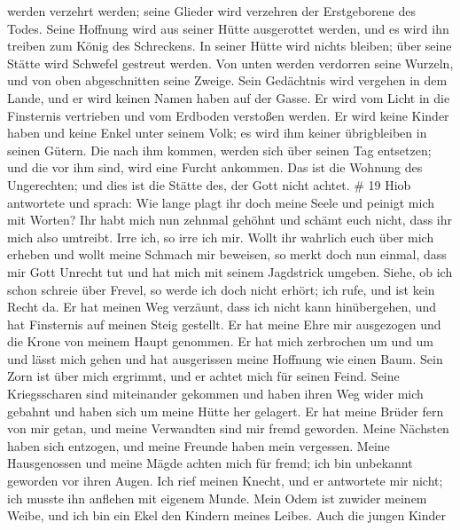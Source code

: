 werden verzehrt werden; seine Glieder wird verzehren der Erstgeborene
des Todes.  Seine Hoffnung wird aus seiner Hütte
ausgerottet werden, und es wird ihn treiben zum König des Schreckens.
 In seiner Hütte wird nichts bleiben; über seine Stätte
wird Schwefel gestreut werden.  Von unten werden verdorren
seine Wurzeln, und von oben abgeschnitten seine Zweige. 
Sein Gedächtnis wird vergehen in dem Lande, und er wird keinen Namen
haben auf der Gasse.  Er wird vom Licht in die Finsternis
vertrieben und vom Erdboden verstoßen werden.  Er wird
keine Kinder haben und keine Enkel unter seinem Volk; es wird ihm keiner
übrigbleiben in seinen Gütern.  Die nach ihm kommen, werden
sich über seinen Tag entsetzen; und die vor ihm sind, wird eine Furcht
ankommen.  Das ist die Wohnung des Ungerechten; und dies
ist die Stätte des, der Gott nicht achtet. \# 19  Hiob
antwortete und sprach:  Wie lange plagt ihr doch meine Seele
und peinigt mich mit Worten?  Ihr habt mich nun zehnmal
gehöhnt und schämt euch nicht, dass ihr mich also umtreibt. 
Irre ich, so irre ich mir.  Wollt ihr wahrlich euch über
mich erheben und wollt meine Schmach mir beweisen,  so merkt
doch nun einmal, dass mir Gott Unrecht tut und hat mich mit seinem
Jagdstrick umgeben.  Siehe, ob ich schon schreie über
Frevel, so werde ich doch nicht erhört; ich rufe, und ist kein Recht da.
 Er hat meinen Weg verzäunt, dass ich nicht kann
hinübergehen, und hat Finsternis auf meinen Steig gestellt. 
Er hat meine Ehre mir ausgezogen und die Krone von meinem Haupt
genommen.  Er hat mich zerbrochen um und um und lässt mich
gehen und hat ausgerissen meine Hoffnung wie einen Baum. 
Sein Zorn ist über mich ergrimmt, und er achtet mich für seinen Feind.
 Seine Kriegsscharen sind miteinander gekommen und haben
ihren Weg wider mich gebahnt und haben sich um meine Hütte her gelagert.
 Er hat meine Brüder fern von mir getan, und meine
Verwandten sind mir fremd geworden.  Meine Nächsten haben
sich entzogen, und meine Freunde haben mein vergessen. 
Meine Hausgenossen und meine Mägde achten mich für fremd; ich bin
unbekannt geworden vor ihren Augen.  Ich rief meinen
Knecht, und er antwortete mir nicht; ich musste ihn anflehen mit eigenem
Munde.  Mein Odem ist zuwider meinem Weibe, und ich bin ein
Ekel den Kindern meines Leibes.  Auch die jungen Kinder
